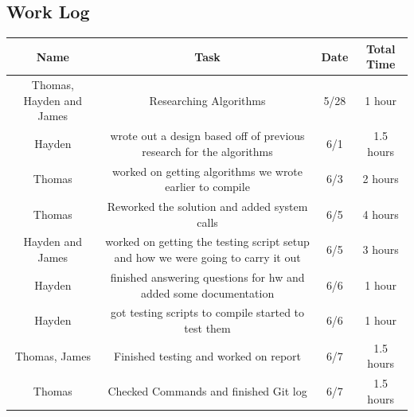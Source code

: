 \documentclass[draftclsnofoot, onecolumn, compsoc, 10pt]{IEEEtran}
\begin{document}
\begin{landscape}
\section{Work Log}
    	\begin{center}
			\begin{tabular}{||c c c c ||}
			\hline
			Name & Task & Date & Total Time\\[0.5ex]
			\hline \hline
			Thomas, Hayden and James & Researching Algorithms & 5/28 & 1 hour\\
			\hline
			Hayden & wrote out a design based off of previous research for the algorithms & 6/1 & 1.5 hours\\
			\hline
			Thomas & worked on getting algorithms we wrote earlier to compile & 6/3 & 2 hours\\
			\hline
			Thomas & Reworked the solution and added system calls & 6/5 & 4 hours\\
			\hline
			Hayden and James & worked on getting the testing script setup and how we were going to carry it out & 6/5 & 3 hours\\
			\hline
			Hayden & finished answering questions for hw and added some documentation & 6/6 & 1 hour\\
			\hline
			Hayden & got testing scripts to compile started to test them & 6/6 & 1 hour\\
			\hline
            Thomas, James & Finished testing and  worked on report & 6/7 & 1.5 hours\\
            \hline
            Thomas & Checked Commands and finished Git log & 6/7 & 1.5 hours\\
            \hline
			\end{tabular}
		\end{center}
\end{landscape}
\newpage
\end{document}
